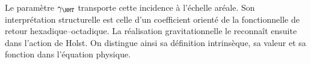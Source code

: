 Le paramètre \(\gamma_{\HMT}\) transporte cette incidence à l'échelle
aréale. Son interprétation structurelle est celle d'un coefficient orienté
de la fonctionnelle de retour hexadique--octadique. La réalisation gravitationnelle
le reconnaît ensuite dans l'action de Holst. On distingue ainsi sa
définition intrinsèque, sa valeur et sa fonction dans l'équation physique.
